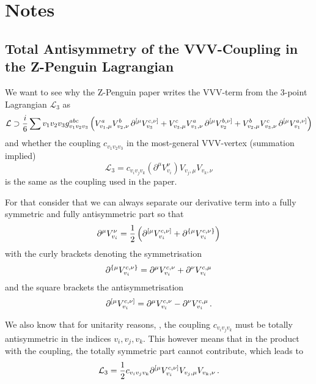 \section{Notes}
\label{sec:notes}

\subsection{Total Antisymmetry of the VVV-Coupling in the Z-Penguin Lagrangian}

We want to see why the Z-Penguin paper writes the VVV-term from the 3-point Lagrangian $\mathcal{L}_3$ as
\begin{align}
    \mathcal{L} \supset \frac{i}{6} \sum{v_1 v_2 v_3} 
    g_{v_1v_2v_3}^{abc} \left( V_{v_1,\mu}^a V_{v_2,\nu}^b
    \, \partial_{\vphantom{v_3}}^{[\mu} V_{v_3}^{c,\nu]} + V_{v_3,\mu}^c V_{v_1,\nu}^a  
    \, \partial_{\vphantom{v_2}}^{[\mu} V_{v_2}^{b,\nu]} + V_{v_2,\mu}^b
    V_{v_3,\nu}^c \, \partial_{\vphantom{v_1}}^{[\mu} V_{v_1}^{a,\nu]}
    \right) 
\end{align}
and whether the coupling $c_{v_1v_2v_3}$ in the most-general VVV-vertex (summation implied)
\begin{equation}
    \mathcal{L}_3 = c_{v_i v_j v_k} (\partial^{\mu} V_{v_i}^{\nu}) V_{v_j, \mu} V_{v_k, \nu}
\end{equation}
is the same as the coupling used in the paper.

For that consider that we can always separate our derivative term into a fully symmetric and fully antisymmetric part so that
\begin{align}
    \partial^{\mu} V_{v_i}^{\nu} = \frac{1}{2} \left(\partial_{\vphantom{v_i}}^{[\mu} V_{v_i}^{c,\nu]} + \partial_{\vphantom{v_i}}^{\{ \mu} V_{v_i}^{c,\nu \}} \right)
\end{align}
with the curly brackets denoting the symmetrisation 
\begin{equation}
    \partial_{\vphantom{v_i}}^{\{ \mu} V_{v_i}^{c,\nu \}} = \partial^\mu V_{v_i}^{c,\nu} + \partial^\nu V_{v_i}^{c,\mu}
\end{equation}
and the square brackets the antisymmetrisation
\begin{equation}
    \partial_{\vphantom{v_i}}^{[\mu} V_{v_i}^{c,\nu]} = \partial^\mu V_{v_i}^{c,\nu} - \partial^\nu V_{v_i}^{c,\mu} \,.
\end{equation}

We also know that for unitarity reasons, \cite{unitarity}, the coupling $c_{v_i v_j v_k}$ must be totally antisymmetric in the indices $v_i, v_j, v_k$.
This however means that in the product with the coupling, the totally symmetric part cannot contribute, which leads to
\begin{align}
    \mathcal{L}_3 = \frac{1}{2}c_{v_i v_j v_k} \partial_{\vphantom{v_i}}^{[\mu} V_{v_i}^{c,\nu]} V_{v_j, \mu} V_{v_k, \nu} \,.
\end{align}

